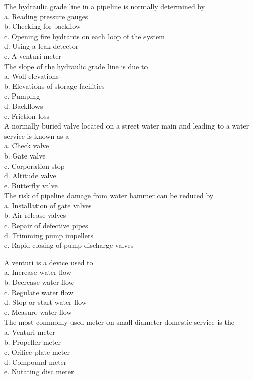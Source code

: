 The hydraulic grade line in a pipeline is normally determined by\\
a. Reading pressure gauges\\
b. Checking for backflow\\
c. Opening fire hydrants on each loop of the system\\
d. Using a leak detector\\
e. A venturi meter\\

The slope of the hydraulic grade line is due to\\
a. Woll elevations\\
b. Elevations of storage facilities\\
c. Pumping\\
d. Backflows\\
e. Friction loss\\

A normally buried valve located on a street water main and leading to a water service is known as a\\
a. Check valve\\
b. Gate valve\\
c. Corporation stop\\
d. Altitude valve\\
e. Butterfly valve\\

The risk of pipeline damage from water hammer can be reduced by\\
a. Installation of gate valves\\
b. Air release valves\\
c. Repair of defective pipes\\
d. Trimming pump impellers\\
e. Rapid closing of pump discharge valves 

A venturi is a device used to\\
a. Increase water flow\\
b. Decrease water flow\\
c. Regulate water flow\\
d. Stop or start water flow\\
e. Measure water flow\\

The most commonly used meter on small diameter domestic service is the\\
a. Venturi meter\\
b. Propeller meter\\
c. Orifice plate meter\\
d. Compound meter\\
e. Nutating disc meter\\

